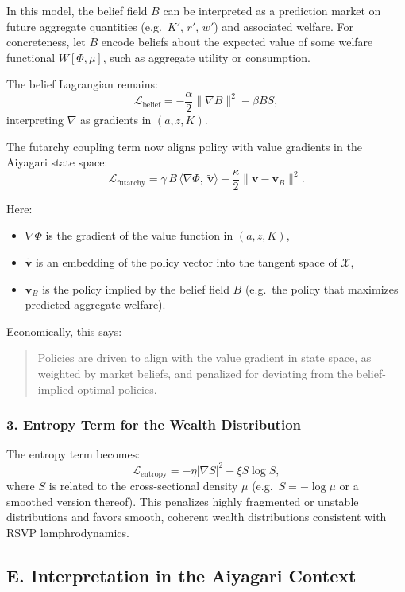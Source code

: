 \documentclass[12pt]{article}
\begin{document}
In this model, the belief field $B$ can be interpreted as a prediction
market on future aggregate quantities (e.g.\ $K'$, $r'$, $w'$) and
associated welfare. For concreteness, let $B$ encode beliefs about the
expected value of some welfare functional $W[\Phi,\mu]$, such as
aggregate utility or consumption.

The belief Lagrangian remains:
\[
\mathcal{L}_{\text{belief}}
=
- \frac{\alpha}{2}\|\nabla B\|^2
- \beta B S,
\]
interpreting $\nabla$ as gradients in $(a,z,K)$.

The futarchy coupling term now aligns policy with value gradients in the
Aiyagari state space:
\[
\mathcal{L}_{\text{futarchy}}
=
\gamma\, B\, \langle \nabla \Phi,\ \tilde{\mathbf{v}} \rangle
- \frac{\kappa}{2}\|\mathbf{v} - \mathbf{v}_B\|^2.
\]

Here:
\begin{itemize}
    \item $\nabla \Phi$ is the gradient of the value function in $(a,z,K)$,
    \item $\tilde{\mathbf{v}}$ is an embedding of the policy vector into
    the tangent space of $\mathcal{X}$,
    \item $\mathbf{v}_B$ is the policy implied by the belief field $B$
    (e.g.\ the policy that maximizes predicted aggregate welfare).
\end{itemize}

Economically, this says:
\begin{quote}
Policies are driven to align with the value gradient in state space, as
weighted by market beliefs, and penalized for deviating from the
belief-implied optimal policies.
\end{quote}

\subsubsection*{3. Entropy Term for the Wealth Distribution}

The entropy term becomes:
\[
\mathcal{L}_{\text{entropy}}
=
- \eta |\nabla S|^2
- \xi S \log S,
\]
where $S$ is related to the cross-sectional density $\mu$ (e.g.\
$S = -\log \mu$ or a smoothed version thereof). This penalizes highly
fragmented or unstable distributions and favors smooth, coherent
wealth distributions consistent with RSVP lamphrodynamics.

\subsection*{E. Interpretation in the Aiyagari Context}
\end{document}
